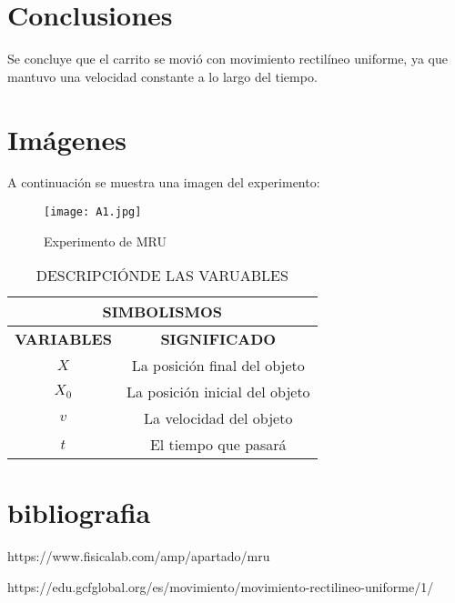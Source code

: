 \documentclass{article}
\begin{document}
\section{Conclusiones}
Se concluye que el carrito se movió con movimiento rectilíneo uniforme, ya que mantuvo una velocidad constante a lo largo del tiempo.

\section{Imágenes}
A continuación se muestra una imagen del experimento:

\begin{figure}[h]
\centering
\texttt{[image: A1.jpg]}
\caption{Experimento de MRU}
\label{fig:carrito_mru}
\end{figure}

\begin{table}[h]
\centering
\begin{tabular}{|c|c|}
\hline
\multicolumn{2}{|c|}{\textbf{SIMBOLISMOS}} \\ \hline
\textbf{VARIABLES} & \textbf{SIGNIFICADO} \\ \hline
$X$ & La posición final del objeto \\ \hline
$X_0$ & La posición inicial del objeto     \\ \hline
$v$ & La velocidad del objeto   \\ \hline
$t$ & El tiempo que pasará \\ \hline

\end{tabular}
\caption{DESCRIPCIÓNDE LAS VARUABLES}
\label{tab:horario}
\end{table}

\section{bibliografia}
 https://www.fisicalab.com/amp/apartado/mru

 https://edu.gcfglobal.org/es/movimiento/movimiento-rectilineo-uniforme/1/
 
\end{document}
